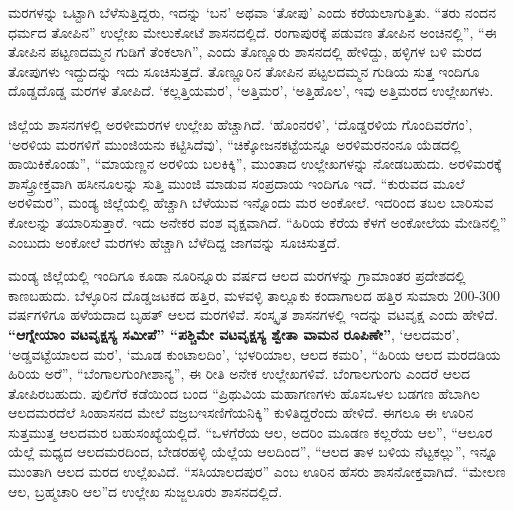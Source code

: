 ಮರಗಳನ್ನು ಒಟ್ಟಾಗಿ ಬೆಳೆಸುತ್ತಿದ್ದರು, ಇದನ್ನು ‘ಬನ’ ಅಥವಾ ‘ತೋಪು’ ಎಂದು ಕರೆಯಲಾಗುತ್ತಿತು. “ತರು ನಂದನ ಧರ್ಮದ ತೋಪಿನ” ಉಲ್ಲೇಖ ಮೇಲುಕೋಟೆ ಶಾಸನದಲ್ಲಿದೆ. ರಂಗಾಪುರಕ್ಕೆ ಪಡುವಣ ತೋಪಿನ ಅಂಚಿನಲ್ಲಿ”, “ಈ ತೋಪಿನ ಪಟ್ಟಣದಮ್ಮನ ಗುಡಿಗೆ ತೆಂಕಲಾಗಿ”, ಎಂದು ತೊಣ್ಣೂರು ಶಾಸನದಲ್ಲಿ ಹೇಳಿದ್ದು, ಹಳ್ಳಿಗಳ ಬಳಿ ಮರದ ತೋಪುಗಳು ಇದ್ದುದನ್ನು ಇದು ಸೂಚಿಸುತ್ತದೆ. ತೊಣ್ಣೂರಿನ ತೋಪಿನ ಪಟ್ಟಲದಮ್ಮನ ಗುಡಿಯ ಸುತ್ತ ಇಂದಿಗೂ ದೊಡ್ಡದೊಡ್ಡ ಮರಗಳ ತೋಪಿದೆ. ‘ಕಲ್ಲತ್ತಿಯಮರ’, ‘ಅತ್ತಿಮರ’, ‘ಅತ್ತಿಹೊಲ’, ಇವು ಅತ್ತಿಮರದ ಉಲ್ಲೇಖಗಳು.

ಜಿಲ್ಲೆಯ ಶಾಸನಗಳಲ್ಲಿ ಅರಳೀಮರಗಳ ಉಲ್ಲೇಖ ಹೆಚ್ಚಾಗಿದೆ. ‘ಹೊಂನರಳಿ’, ‘ದೊಡ್ಡರಳಿಯ ಗೊಂದಿವರೆಗಂ’, ‘ಅರಳಿಯ ಮರಗಳಿಗೆ ಮುಂಜಿಯನು ಕಟ್ಟಿಸಿದೆವು’, “ಚಿಕ್ಕೋಜನಕಟ್ಟೆಯನ್ನೂ ಅರಳಿಮರನಂನೂ ಯೆಡದಲ್ಲಿ ಹಾಯಿಕಿಕೊಂಡು”, “ಮಾಯಣ್ಣನ ಅರಳಿಯ ಬಲಕಿಕ್ಕಿ”, ಮುಂತಾದ ಉಲ್ಲೇಖಗಳನ್ನು ನೋಡಬಹುದು. ಅರಳಿಮರಕ್ಕೆ ಶಾಸ್ತ್ರೋಕ್ತವಾಗಿ ಹಸೀನೂಲನ್ನು ಸುತ್ತಿ ಮುಂಜಿ ಮಾಡುವ ಸಂಪ್ರದಾಯ ಇಂದಿಗೂ ಇದೆ. “ಕುರುವದ ಮೂಲೆ ಅರಳಿಮರ”, ಮಂಡ್ಯ ಜಿಲ್ಲೆಯಲ್ಲಿ ಹೆಚ್ಚಾಗಿ ಬೆಳೆಯುವ ಇನ್ನೊಂದು ಮರ ಅಂಕೋಲೆ. ಇದರಿಂದ ತಬಲ ಬಾರಿಸುವ ಕೋಲನ್ನು ತಯಾರಿಸುತ್ತಾರೆ. ಇದು ಅನೇಕರ ವಂಶ ವೃಕ್ಷವಾಗಿದೆ. “ಹಿರಿಯ ಕೆರೆಯ ಕೆಳಗೆ ಅಂಕೋಲೆಯ ಮೇಡಿ\-ನಲ್ಲಿ” ಎಂಬುದು ಅಂಕೋಲೆ ಮರಗಳು ಹೆಚ್ಚಾಗಿ ಬೆಳೆದಿದ್ದ ಜಾಗವನ್ನು ಸೂಚಿಸುತ್ತದೆ.

ಮಂಡ್ಯ ಜಿಲ್ಲೆಯಲ್ಲಿ ಇಂದಿಗೂ ಕೂಡಾ ನೂರಿನ್ನೂರು ವರ್ಷದ ಆಲದ ಮರಗಳನ್ನು ಗ್ರಾಮಾಂತರ ಪ್ರದೇಶದಲ್ಲಿ ಕಾಣಬಹುದು. ಬೆಳ್ಳೂರಿನ ದೊಡ್ಡಜಟಕದ ಹತ್ತಿರ, ಮಳವಳ್ಳಿ ತಾಲ್ಲೂಕು ಕಂದಾಗಾಲದ ಹತ್ತಿರ ಸುಮಾರು 200-300 ವರ್ಷಗಳಿಗೂ ಹಳೆಯದಾದ ಬೃಹತ್​ ಆಲದ ಮರಗಳಿವೆ. ಸಂಸ್ಕೃತ ಶಾಸನಗಳಲ್ಲಿ ಇದನ್ನು ವಟವೃಕ್ಷ ಎಂದು ಹೇಳಿದೆ. \textbf{“ಆಗ್ನೇಯಾಂ ವಟವೃಕ್ಷಸ್ಯ ಸಮೀಪೆ” “ಪಶ್ಚಿಮೇ ವಟವೃಕ್ಷಸ್ಯ ಶ್ವೇತಾ ವಾಮನ ರೂಪಿಣೇ”}, ‘ಆಲದಮರ’, ‘ಅಡ್ಡವಟ್ಟೆಯಾಲದ ಮರ’, ‘ಮೂಡ ಕುಂಟಾಲದಿಂ’, ‘ಭಳರಿಯಾಲ, ಆಲದ ಕಮರಿ’, “ಹಿರಿಯ ಆಲದ ಮರದಡಿಯ ಹಿರಿಯ ಅರೆ”, “ಬೆಂಗಾಲಗುಂಗೀಶಾನ್ಯ”, ಈ ರೀತಿ ಅನೇಕ ಉಲ್ಲೇಖಗಳಿವೆ. ಬೆಂಗಾಲಗುಂಗು ಎಂದರೆ ಆಲದ ತೋಪಿರಬಹುದು. ಪುಲಿಗೆರೆ ಕಡೆಯಿಂದ ಬಂದ “ಪ್ರಿಥುವಿಯ ಮಹಾಗಣಗಳು ಹೊಸಒಳಲ ಬಡಗಣ ಹೆಬಾಗಿಲ ಆಲದಮರದೆಲೆ ಸಿಂಹಾಸನದ ಮೇಲೆ ವಜ್ರಬಇಸಣಿಗೆಯನಿಕ್ಕಿ” ಕುಳಿತಿದ್ದರೆಂದು ಹೇಳಿದೆ. ಈಗಲೂ ಈ ಊರಿನ ಸುತ್ತಮುತ್ತ ಆಲದಮರ ಬಹುಸಂಖ್ಯೆಯಲ್ಲಿದೆ. “ಒಳಗೆರೆಯ ಆಲ, ಅದರಿಂ ಮೂಡಣ ಕಲ್ಲರೆಯ ಆಲ”, “ಆಲೂರ ಯೆಲ್ಲೆ ಮಧ್ಯದ ಆಲದಮರದಿಂದ, ಬೇಡರಹಳ್ಳಿ ಯೆಲ್ಲೆಯ ಆಲದಿಂದ”, “ಆಲದ ತಾಳ ಬಳಿಯ ನೆಟ್ಟಕಲ್ಲು”, ಇನ್ನೂ ಮುಂತಾಗಿ ಆಲದ ಮರದ ಉಲ್ಲೆಖವಿದೆ. “ಸಸಿಯಾಲದಪುರ” ಎಂಬ ಊರಿನ ಹೆಸರು ಶಾಸನೋಕ್ತವಾಗಿದೆ. “ಮೇಲಣ ಆಲ, ಬ್ರಹ್ಮಚಾರಿ ಆಲ”ದ ಉಲ್ಲೇಖ ಸುಜ್ಜಲೂರು ಶಾಸನದಲ್ಲಿದೆ.

